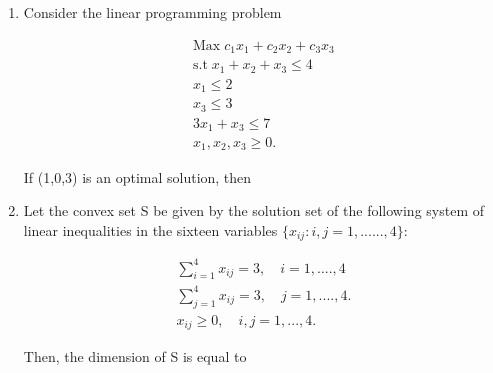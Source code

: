 \documentclass[journal,12pt,twocolumn]{IEEEtran}
\begin{document}
\begin{enumerate}
\item Consider the linear programming problem 
\begin{center}
\begin{align*}
\text{Max} \; c_1x_1 \! + \! c_2x_2 \! + \! c_3x_3 \\
\text{s.t} \; x_1 \! + \! x_2 \! + \! x_3 \! \leqslant \! 4 \\
x_1 \! \leqslant \! 2 \\
x_3 \! \leqslant \! 3 \\
3x_1 \! + \! x_3 \! \leqslant \! 7 \\
x_1, \! x_2, \! x_3 \! \geqslant \! 0.
\end{align*}
\end{center}
\smallskip
If (1,0,3) is an optimal solution, then
\begin{enumerate}[(A)]
\end{enumerate}

\item Let the convex set S be given by the solution set of the following system of linear inequalities in the sixteen variables $\{ x_{ij} \! : \! i,j \! = \! 1,......,4\}:$\\
\begin{center}
\begin{align*}
\sum_{i=1}^{4} x_{ij} \! = \! 3, \quad i = 1,....,4 \\
\sum_{j=1}^{4} x_{ij} \! = \! 3, \quad j=1,....,4. \\
x_{ij} \! \geqslant \! 0, \quad i,j=1,...,4.
\end{align*}
\end{center}
Then, the dimension of S is equal to
\begin{enumerate}[(A)]
\end{enumerate}


\end{enumerate}
\end{document}
